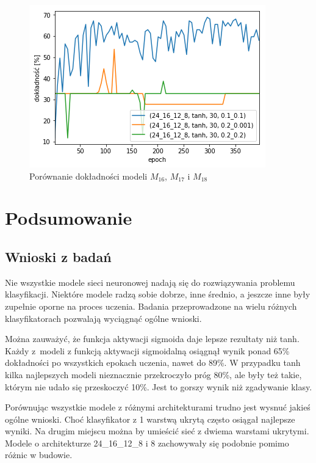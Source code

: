     \begin{figure}[htp]
        \centering
        \includegraphics[scale=0.8]{./img/lr-accuracy-tanh.png}
        \caption{Porównanie dokładności modeli $M_{16}$, $M_{17}$ i $M_{18}$}
    \end{figure}

    \chapter{Podsumowanie}\label{ch:podsumowanie}

    \section{Wnioski z badań}\label{sec:wnioskiZBadań}

    Nie wszystkie modele sieci neuronowej nadają się do rozwiązywania problemu klasyfikacji.
    Niektóre modele radzą sobie dobrze, inne średnio, a jeszcze inne były zupełnie oporne na proces uczenia.
    Badania przeprowadzone na wielu różnych klasyfikatorach pozwalają wyciągnąć ogólne wnioski.

    Można zauważyć, że funkcja aktywacji sigmoida daje lepsze rezultaty niż tanh.
    Każdy z~modeli z funkcją aktywacji sigmoidalną osiągnął wynik ponad 65\% dokładności po wszystkich epokach uczenia, nawet do 89\%.
    W przypadku tanh kilka najlepszych modeli nieznacznie przekroczyło próg 80\%, ale były też takie, którym nie udało się przeskoczyć 10\%.
    Jest to gorszy wynik niż zgadywanie klasy.

    Porównując wszystkie modele z różnymi architekturami trudno jest wysnuć jakieś ogólne wnioski.
    Choć klasyfikator z 1 warstwą ukrytą często osiągał najlepsze wyniki.
    Na drugim miejscu można by umieścić sieć z dwiema warstami ukrytymi.
    Modele o architekturze 24\_16\_12\_8 i 8 zachowywały się podobnie pomimo różnic w budowie.

